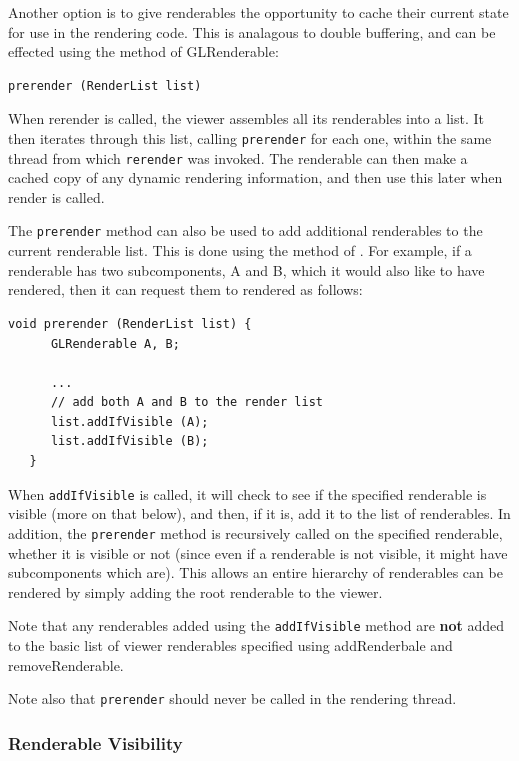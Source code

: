 \documentclass{article}
\begin{document}
Another option is to give renderables the opportunity to cache their
current state for use in the rendering code. This is analagous to
double buffering, and can be effected using the 
 method of
GLRenderable:

\begin{lstlisting}[]
   prerender (RenderList list)
\end{lstlisting}

When rerender is called, the viewer assembles all its renderables into
a list. It then iterates through this list, calling {\tt prerender}
for each one, within the same thread from which {\tt rerender} was
invoked. The renderable can then make a cached copy of any dynamic
rendering information, and then use this later when render is called.

The {\tt prerender} method can also be used to add additional renderables to
the current renderable list. This is done using the 
method of . 
For example, if a renderable has two
subcomponents, A and B, which it would also like to have rendered,
then it can request them to rendered as follows:
\begin{lstlisting}[]
   void prerender (RenderList list) {
      GLRenderable A, B;

      ... 
      // add both A and B to the render list
      list.addIfVisible (A);
      list.addIfVisible (B);
   }
\end{lstlisting}
When {\tt addIfVisible} is called, it will check to see if the specified
renderable is visible (more on that below), and then, if it is, add it
to the list of renderables. In addition, the {\tt prerender} method is
recursively called on the specified renderable, whether it is visible or
not (since even if a renderable is not visible, it might have
subcomponents which are).  This allows an entire hierarchy of
renderables can be rendered by simply adding the root renderable to
the viewer.

Note that any renderables added using the {\tt addIfVisible} method are
{\bf not} added to the basic list of viewer renderables specified using
addRenderbale and removeRenderable.

Note also that {\tt prerender} should never be called in the rendering
thread.

\subsubsection{Renderable Visibility}
\label{visibilitySec}
\end{document}
